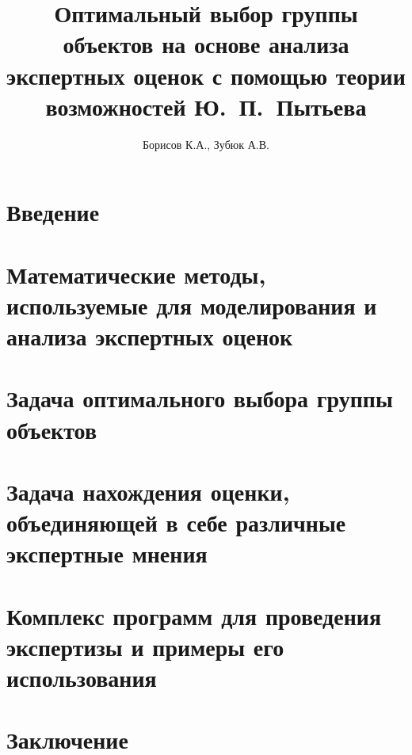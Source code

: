 \documentclass{article}
\begin{document}

\thispagestyle{empty}			

\title{Оптимальный выбор группы объектов на основе анализа экспертных оценок с помощью теории возможностей Ю.~П.~Пытьева} 
\author{Борисов К.А., Зубюк А.В.}
\maketitle

\tableofcontents
\newpage

\section{Введение} 
% 

\section{Математические методы, используемые для моделирования и анализа экспертных оценок}
% 

\section{Задача оптимального выбора группы объектов}
 

\section{Задача нахождения оценки, объединяющей в себе различные экспертные мнения}
% 

\section{Комплекс программ для проведения экспертизы и примеры его использования }
% 

\section{Заключение}
% 

\end{document}
